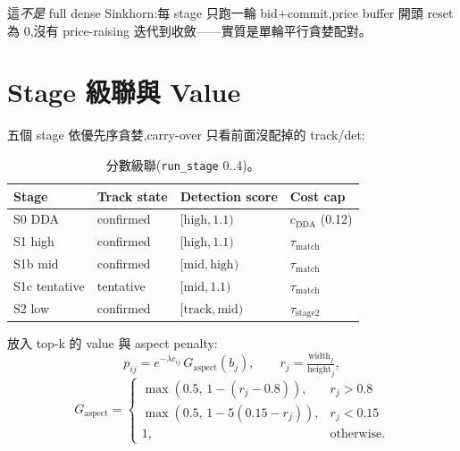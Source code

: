 \noindent
這\emph{不是} full dense Sinkhorn:每 stage 只跑一輪 bid+commit,price buffer 開頭
reset 為 0,沒有 price-raising 迭代到收斂——實質是單輪平行貪婪配對。

\section{Stage 級聯與 Value}\label{sec:au-stage}
五個 stage 依優先序貪婪,carry-over 只看前面沒配掉的 track/det:

\begin{table}[h]\centering\small\renewcommand{\arraystretch}{1.2}
\begin{tabular}{@{}llll@{}}
\toprule
Stage & Track state & Detection score & Cost cap \\
\midrule
S0 DDA       & confirmed  & \([\text{high},1.1)\)         & \(c_{\mathrm{DDA}}\) (0.12) \\
S1 high      & confirmed  & \([\text{high},1.1)\)         & \(\tau_{\mathrm{match}}\) \\
S1b mid      & confirmed  & \([\text{mid},\text{high})\)  & \(\tau_{\mathrm{match}}\) \\
S1c tentative& tentative  & \([\text{mid},1.1)\)          & \(\tau_{\mathrm{match}}\) \\
S2 low       & confirmed  & \([\text{track},\text{mid})\) & \(\tau_{\mathrm{stage2}}\) \\
\bottomrule
\end{tabular}
\caption{分數級聯(\texttt{run\_stage} 0..4)。}\label{tab:au-stage}
\end{table}

放入 top-k 的 value 與 aspect penalty:
\begin{equation}\label{eq:au-value}
  p_{ij}=e^{-\lambda c_{ij}}\,G_{\mathrm{aspect}}(b_j),\qquad
  r_j=\tfrac{\mathrm{width}_j}{\mathrm{height}_j},
\end{equation}
\begin{equation}\label{eq:au-aspect}
  G_{\mathrm{aspect}}=
  \begin{cases}
    \max(0.5,\,1-(r_j-0.8)), & r_j>0.8\\
    \max(0.5,\,1-5(0.15-r_j)), & r_j<0.15\\
    1, & \text{otherwise.}
  \end{cases}
\end{equation}

